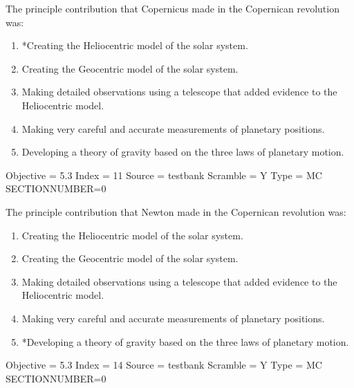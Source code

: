 \documentclass[11pt]{article}
\begin{document}
\begin{enumerate}
\begin{minipage}{\textwidth}
\begin{minipage}{\textwidth}
\item The principle contribution that Copernicus made in the Copernican revolution was:
\begin{enumerate} 
\setlength{\itemsep}{1pt} 
\setlength{\parskip}{0pt} 
\setlength{\parsep}{0pt}
\setlength{\multicolsep}{1pt} 
\item *Creating the Heliocentric model of the solar system.
\item Creating the Geocentric model of the solar system.
\item Making detailed observations using a telescope that added evidence to the Heliocentric model.
\item Making very careful and accurate measurements of planetary positions.
\item Developing a theory of gravity based on the three laws of planetary motion.
\end{enumerate} 
Objective = 5.3
Index = 11
Source = testbank
Scramble = Y
Type = MC
SECTIONNUMBER=0
\end{minipage}
\end{minipage}
\vskip 0.20in

\begin{minipage}{\textwidth}
\begin{minipage}{\textwidth}
\item The principle contribution that Newton made in the Copernican revolution was:
\begin{enumerate} 
\setlength{\itemsep}{1pt} 
\setlength{\parskip}{0pt} 
\setlength{\parsep}{0pt}
\setlength{\multicolsep}{1pt} 
\item Creating the Heliocentric model of the solar system.
\item Creating the Geocentric model of the solar system.
\item Making detailed observations using a telescope that added evidence to the Heliocentric model.
\item Making very careful and accurate measurements of planetary positions.
\item *Developing a theory of gravity based on the three laws of planetary motion.
\end{enumerate} 
Objective = 5.3
Index = 14
Source = testbank
Scramble = Y
Type = MC
SECTIONNUMBER=0
\end{minipage}
\end{minipage}
\vskip 0.20in


\end{enumerate}
\end{document}
